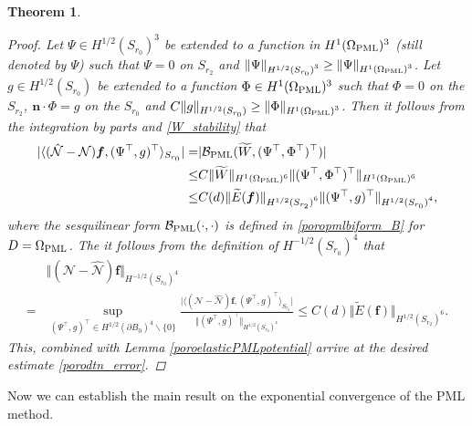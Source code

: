 \documentclass[11pt]{article}
\newcommand{\ba}{\backslash}
\newcommand{\pa}{\partial}
\newcommand{\Om}{\Omega}
\newcommand{\wid}{\widetilde}
\newcommand{\bs}{\boldsymbol}
\newcommand{\PML}{{\rm PML}}
\newtheorem{theorem}{Theorem}[section]
\begin{document}
\begin{theorem}
\begin{proof}
Let $\Psi \in H^{1/2}( S_{r_0})^3$ be extended to a function in $H^{1}(\Om_{\PML})^{3}$ 
(still denoted by $\Psi$) such that $\Psi = 0$ on $S_{r_2}$ and $\Vert \Psi\Vert_{{ H^{1/2}( S_{r_0})}^3}
\geq \Vert\Psi \Vert_{{ H^{1}( \Om_{\PML})}^3}$. Let $g\in H^{1/2}( S_{r_0})$ be extended to a function  
$\Phi\in H^{1}(\Om_{\PML})^3$  such that $\Phi=0$ on the $ S_{r_2}$, ${\bs n}\cdot \Phi=g$ on the 
$ S_{r_0}$ and $C\Vert g\Vert_{{ H^{1/2}( S_{r_0})}}\geq \Vert\Phi \Vert_{{ H^{1}( \Om_{\PML})}^3}$.
Then it follows from the integration by parts and \eqref{W_stability} that
\begin{equation}
\begin{aligned}
\lvert \langle(\hat{\mathcal{N}}-\mathcal{N})\bs{f},(\Psi^{\top},g)^{\top}\rangle_{ S_{r_0}}\rvert
=&\lvert \mathcal{B}_{\PML}(\wid{W},(\Psi^{\top},\Phi^{\top})^{\top})\rvert\\
\leq &C \Vert \wid{W}\Vert_{H^1(\Om_{\PML})^6}\Vert (\Psi^{\top},\Phi^{\top})^{\top} \Vert_{H^1(\Om_{\PML})^6}\\
\leq& C(d)\Vert \wid{E}(\bs{f})\Vert_{{ H^{1/2}( S_{r_2})}^6}\Vert(\Psi^{\top},g)^{\top}\Vert_{{ H^{1/2}( S_{r_0})}^4},
\end{aligned} 
\end{equation}
where the sesquilinear form $\mathcal{B}_{\PML}(\cdot,\cdot)$ is defined in \eqref{poropmlbiform_B} 
for $D=\Om_{\PML}$. The it follows from the definition of $H^{-1/2}(S_{r_0})^4$ that 
\begin{equation*}
\begin{aligned}
&\Vert (\mathcal{N}-\hat{\mathcal{N}})\bs{f}\Vert_{{ H^{-1/2}( S_{r_0})}^4}\\
=& \sup\limits_{(\Psi^{\top},g)^{\top} \in H^{1/2}(\pa B_{0})^{4}\ba\{0\}}\frac{\lvert
\langle(\mathcal{N}-\hat{\mathcal{N}})\bs{f},(\Psi^{\top},g)^{\top}\rangle_{S_{r_0}}\rvert}
{\Vert (\Psi^{\top},g)^{\top}\Vert_{{ H^{1/2}(S_{r_0})}^4}}
\leq C(d)\Vert \wid{E}(\bs{f})\Vert_{{ H^{1/2}( S_{r_2})}^6}.
\end{aligned}
\end{equation*}
This, combined with Lemma \ref{poroelasticPMLpotential} arrive at the desired estimate \eqref{porodtn_error}.
\end{proof}


\end{theorem} 
Now we can establish the main result on the exponential convergence of the PML method.
\end{document}
